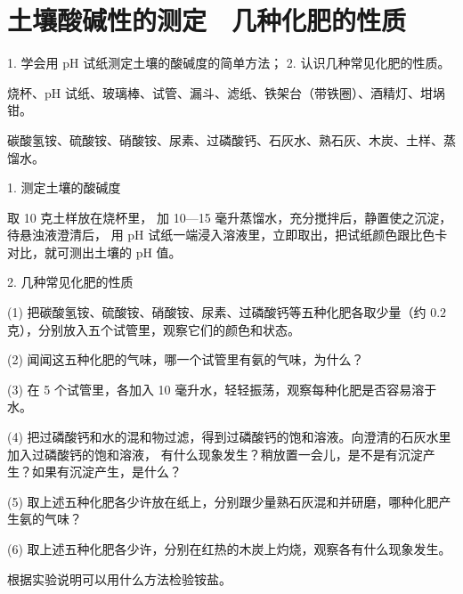 \section{土壤酸碱性的测定　几种化肥的性质}\label{sec:xssy-sy9}

\begin{shiyanmudi}
    1. 学会用 pH 试纸测定土壤的酸碱度的简单方法； 2. 认识几种常见化肥的性质。
\end{shiyanmudi}


\begin{shiyanyongpin}
    烧杯、pH 试纸、玻璃棒、试管、漏斗、滤纸、铁架台（带铁圈）、酒精灯、坩埚钳。

    碳酸氢铵、硫酸铵、硝酸铵、尿素、过磷酸钙、石灰水、熟石灰、木炭、土样、蒸馏水。
\end{shiyanyongpin}


\begin{shiyanbuzhou}
    1. 测定土壤的酸碱度

    取 10 克土样放在烧杯里， 加 10—15 毫升蒸馏水，充分搅拌后，静置使之沉淀，待悬浊液澄清后，
    用 pH 试纸一端浸入溶液里，立即取出，把试纸颜色跟比色卡对比，就可测出土壤的 pH 值。

    2. 几种常见化肥的性质

    (1) 把碳酸氢铵、硫酸铵、硝酸铵、尿素、过磷酸钙等五种化肥各取少量（约 $0.2$ 克），分别放入五个试管里，观察它们的颜色和状态。

    (2) 闻闻这五种化肥的气味，哪一个试管里有氨的气味，为什么？

    (3) 在 5 个试管里，各加入 10 毫升水，轻轻振荡，观察每种化肥是否容易溶于水。

    (4) 把过磷酸钙和水的混和物过滤，得到过磷酸钙的饱和溶液。向澄清的石灰水里加入过磷酸钙的饱和溶液，
    有什么现象发生？稍放置一会儿，是不是有沉淀产生？如果有沉淀产生，是什么？

    (5) 取上述五种化肥各少许放在纸上，分别跟少量熟石灰混和并研磨，哪种化肥产生氨的气味？

    (6) 取上述五种化肥各少许，分别在红热的木炭上灼烧，观察各有什么现象发生。
\end{shiyanbuzhou}


\begin{wentihetaolun}
    根据实验说明可以用什么方法检验铵盐。
\end{wentihetaolun}

